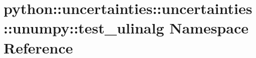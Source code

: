 \hypertarget{namespacepython_1_1uncertainties_1_1uncertainties_1_1unumpy_1_1test__ulinalg}{
\section{python::uncertainties::uncertainties::unumpy::test\_\-ulinalg Namespace Reference}
\label{namespacepython_1_1uncertainties_1_1uncertainties_1_1unumpy_1_1test__ulinalg}
}
